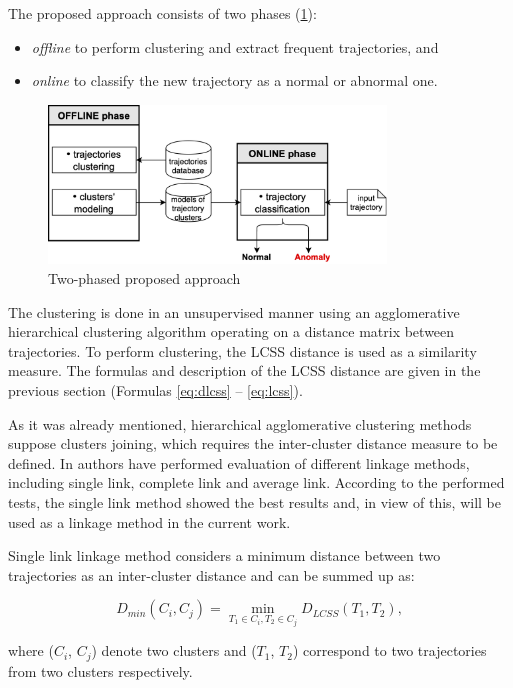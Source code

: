 The proposed approach consists of two phases (\ref{fig:str}):
\begin{itemize}
	\item \textit{offline} to perform clustering and extract frequent trajectories, and
	\item \textit{online} to classify the new trajectory as a normal or abnormal one.
\end{itemize}
\begin{figure}[!htb]
	\centering{}
	\includegraphics[width=0.8\textwidth]{images/str.png}
	\caption{Two-phased proposed approach}
	\label{fig:str}
\end{figure}

The clustering is done in an unsupervised manner using an agglomerative hierarchical clustering algorithm operating on a distance matrix between trajectories. To perform clustering, the LCSS distance is used as a similarity measure. The formulas and description of the LCSS distance are given in the previous section (Formulas \ref{eq:dlcss} -- \ref{eq:lcss}).

As it was already mentioned, hierarchical agglomerative clustering methods suppose clusters joining, which requires the inter-cluster distance measure to be defined. In \cite{inproceedings:7_related_work} authors have performed evaluation of different linkage methods, including single link, complete link and average link. According to the performed tests, the single link method showed the best results and, in view of this, will be used as a linkage method in the current work.

Single link linkage method considers a minimum distance between two trajectories as an inter-cluster distance and can be summed up as:

\begin{equation} \label{eq:single_link}
	D_{min}(C_i, C_j) = \min_{T_1 \in C_i, T_2 \in C_j} D_{LCSS}(T_1, T_2),
\end{equation} 

where ($C_i$, $C_j$) denote two clusters and ($T_1$, $T_2$) correspond to two trajectories from two clusters respectively.

